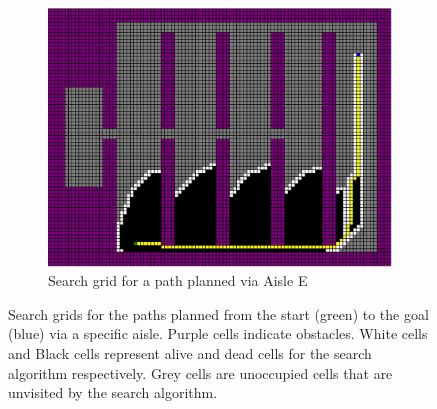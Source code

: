 \documentclass[a4paper,12pt]{article}
\begin{document}
\begin{figure}[htp]
\begin{subfigure}{.45\textwidth}
					\includegraphics[width=\textwidth]{../exports/initial_search_grid_aisleE}
					\caption{Search grid for a path planned via Aisle E}
					\label{fig:searchGridAisleE}
				\end{subfigure}
				\caption{Search grids for the paths planned from the start (green) to the goal (blue) via a specific aisle. Purple cells indicate obstacles. White cells and Black cells represent alive and dead cells for the search algorithm respectively. Grey cells are unoccupied cells that are unvisited by the search algorithm.}
				\label{fig:searchGridViaAisles}
			\end{figure}
			
\end{document}
